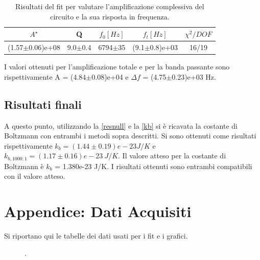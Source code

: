 \documentclass[a4paper,10pt]{article}
\begin{document}
\begin{table}[H]
	\centering
	\begin{tabular}{c|c|c|c|c}
	$A^\star$ & Q & $f_0[Hz]$ & $f_t[Hz]$ & $\chi^2/DOF$ \\
	\hline
	(1.57$\pm$0.06)e+08 & 9.0$\pm$0.4 & 6794$\pm$35 & (9.1$\pm$0.8)e+03 & 16/19 \\
	\end{tabular}
	\caption{Risultati del fit per valutare l'amplificazione complessiva del circuito e la sua risposta in frequenza.}
	\label{tab:risult}
\end{table}

I valori ottenuti per l'amplificazione totale e per la banda passante sono rispettivamente A = (4.84$\pm$0.08)e+04 e $\Delta f$ = (4.75$\pm$0.23)e+03 Hz.



\subsection{Risultati finali}
A questo punto, utilizzando la \eqref{resnull} e la \eqref{kb} si è ricavata la costante di Boltzmann con entrambi i metodi sopra descritti. Si sono ottenuti come risultati rispettivamente $k_b = (1.44\pm0.19)e-23 J/K$ e $k_{b,1000:1} = (1.17\pm0.16)e-23~J/K $. Il valore atteso per la costante di Boltzmann è $k_b$ = 1.380e-23 J/K. I risultati ottenuti sono entrambi compatibili con il valore atteso. 

\section{Appendice: Dati Acquisiti}
Si riportano qui le tabelle dei dati usati per i fit e i grafici.

\begin{table}[H]
	\centering
	
	\caption{.}
	\label{tab:prepreamp}
\end{table}

\begin{table}
	\centering
	
	\caption{.}
	\label{tab:postpreamp}
\end{table}

\begin{figure}
	\begin{minipage}{0.64\textwidth}
		\begin{table}[H]
			\centering
			
			\caption{.}
			\label{tab:bandpass}
		\end{table}
	\end{minipage}
	\begin{minipage}{0.34\textwidth}
		\begin{table}[H]
			\centering
			
			\caption{.}
			\label{tab:RMScal}
		\end{table}
	\end{minipage}
\end{figure}
\end{document}
